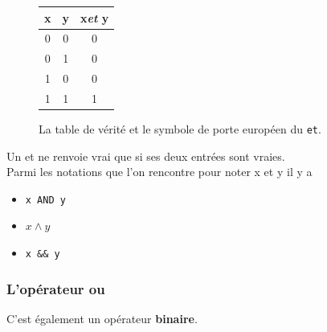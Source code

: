 \begin{figure}[H]
    \begin{center}
        \begin{tabular}{|c|c|c|}
            \hline\rowcolor{UGLiOrange}
            {\boxfont\color{white}x} & {\boxfont\color{white}y} & {\boxfont\color{white}x\textit{et} y} \\
            \hline
            0                        & 0                        & 0                                     \\
            \hline
            0                        & 1                        & 0                                     \\
            \hline
            1                        & 0                        & 0                                     \\
            \hline
            1                        & 1                        & 1                                     \\
            \hline
        \end{tabular}
        \hspace{3em}
    \end{center}
    \caption*{La table de vérité et le symbole de porte européen du \texttt{et}.}
\end{figure}
Un \og et\fg{} ne renvoie vrai que si ses deux entrées sont vraies.\\
Parmi les notations que l'on rencontre pour noter \og x et y\fg{} il y a
\begin{itemize}
    \item 	 \texttt{x AND y}
    \item 	$x\wedge y$
    \item 	\texttt{x \&\& y}
\end{itemize}


\subsubsection*{L'opérateur \og ou\fg{}}

C'est également un opérateur \textbf{binaire}.

